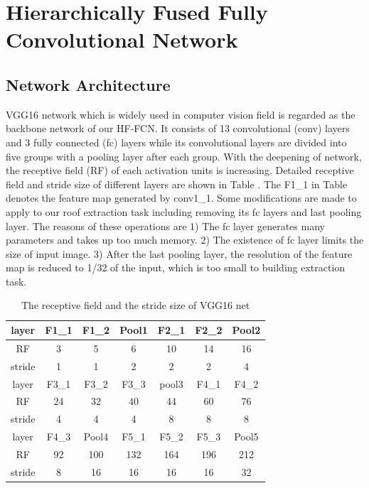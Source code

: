 \section{Hierarchically Fused Fully Convolutional Network}
\label{Sec:HF-FCN}
\subsection{Network Architecture}
 VGG16 network which is widely used in computer vision field is regarded as the backbone network of our HF-FCN. It consists of 13 convolutional (conv) layers and 3 fully connected (fc) layers while its convolutional layers are divided into five groups with a pooling layer after each group. With the deepening of network, the receptive field (RF) of each activation units is increasing. Detailed receptive field and stride size of different layers are shown in Table  . The F1\_1 in Table  denotes the feature map generated by conv1\_1. Some modifications are made to apply to our roof extraction task including removing its fc layers and last pooling layer. The reasons of these operations are 1) The fc layer generates many parameters and takes up too much memory. 2) The existence of fc layer limits the size of input image. 3) After the last pooling layer, the resolution of the feature map is reduced to 1/32 of the input, which is too small to building extraction task.\par
\begin{table}[!h!b!p]
\centering
\caption{The receptive field and the stride size of VGG16 net}

\begin{tabular}{c||cccccc}
\hline
layer &F1\_1 &F1\_2 & Pool1 &F2\_1 &F2\_2 &Pool2 \\ \hline
RF &3&5&6&10&14&16\\ \hline
stride &1 &1 &2 &2 &2 & 4\\ \hline\hline
layer &F3\_1 &F3\_2 & F3\_3 &pool3 &F4\_1&F4\_2\\ \hline
RF &24&32&40&44&60&76\\ \hline
stride &4 &4 &4 &8 &8 &8\\ \hline\hline
layer &F4\_3&Pool4 &F5\_1 &F5\_2 &F5\_3& Pool5 \\ \hline
RF &92 &100 &132 &164 &196 &212 \\ \hline
stride &8 &16 &16 &16 &16 &32\\ \hline
\end{tabular}
\end{table}
